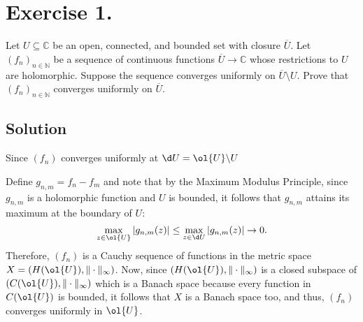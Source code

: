 
\section{Exercise 1.}

Let \( U \subseteq \mathbb{C} \) be an open, connected, and bounded set with closure \(\overline{U}\). Let \((f_n)_{n \in \mathbb{N}}\) be a sequence of continuous functions \( \overline{U} \to \mathbb{C} \) whose restrictions to \( U \) are holomorphic. Suppose the sequence converges uniformly on \(\overline{U} \setminus U\). Prove that \((f_n)_{n \in \mathbb{N}}\) converges uniformly on \(\overline{U}\).

\subsection*{Solution}

Since $(f_n)$ converges uniformly at $\d U = \ol{U} \backslash U$

Define $g_{n,m} = f_n - f_m$ and note that by the Maximum Modulus Principle, since $g_{n,m}$ is a holomorphic function and $U$ is bounded, it follows that $g_{n,m}$ attains its maximum at the boundary of $U$:
\[ \max_{z\in \ol{U}} |g_{n,m}(z)| \leq \max_{z \in \d U} |g_{n,m}(z)| \to 0. \]
Therefore, $(f_n)$ is a Cauchy sequence of functions in the metric space $X = (H(\ol{U}), \|\cdot\|_\infty)$. Now, since $(H(\ol{U}), \|\cdot\|_\infty)$ is a closed subspace of $(C(\ol{U}), \|\cdot\|_\infty)$ which is a Banach space because every function in $C(\ol{U})$ is bounded, it follows that $X$ is a Banach space too, and thus, $(f_n)$ converges uniformly in $\ol{U}$.
